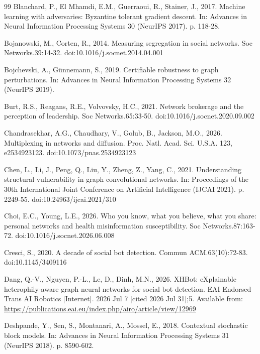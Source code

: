 \documentclass[onecolumn,pdflatex,sn-basic,Numbered]{sn-jnl}
\theoremstyle{thmstyleone}
\theoremstyle{thmstylethree}
\begin{document}
\begin{thebibliography}{99}
Blanchard, P., El Mhamdi, E.M., Guerraoui, R., Stainer, J., 2017. Machine learning with adversaries: Byzantine tolerant gradient descent. In: Advances in Neural Information Processing Systems 30 (NeurIPS 2017). p. 118-28.

Bojanowski, M., Corten, R., 2014. Measuring segregation in social networks. Soc Networks.39:14-32. doi:10.1016/j.socnet.2014.04.001

Bojchevski, A., G\"unnemann, S., 2019. Certifiable robustness to graph perturbations. In: Advances in Neural Information Processing Systems 32 (NeurIPS 2019).

Burt, R.S., Reagans, R.E., Volvovsky, H.C., 2021. Network brokerage and the perception of leadership. Soc Networks.65:33-50. doi:10.1016/j.socnet.2020.09.002

Chandrasekhar, A.G., Chaudhary, V., Golub, B., Jackson, M.O., 2026. Multiplexing in networks and diffusion. Proc. Natl. Acad. Sci. U.S.A. 123, e2534923123. doi:10.1073/pnas.2534923123

Chen, L., Li, J., Peng, Q., Liu, Y., Zheng, Z., Yang, C., 2021. Understanding structural vulnerability in graph convolutional networks. In: Proceedings of the 30th International Joint Conference on Artificial Intelligence (IJCAI 2021). p. 2249-55. doi:10.24963/ijcai.2021/310

Choi, E.C., Young, L.E., 2026. Who you know, what you believe, what you share: personal networks and health misinformation susceptibility. Soc Networks.87:163-72. doi:10.1016/j.socnet.2026.06.008

Cresci, S., 2020. A decade of social bot detection. Commun ACM.63(10):72-83. doi:10.1145/3409116

Dang, Q.-V., Nguyen, P.-L., Le, D., Dinh, M.N., 2026. XHBot: eXplainable heterophily-aware graph neural networks for social bot detection. EAI Endorsed Trans AI Robotics [Internet]. 2026 Jul 7 [cited 2026 Jul 31];5. Available from: \url{https://publications.eai.eu/index.php/airo/article/view/12969}

Deshpande, Y., Sen, S., Montanari, A., Mossel, E., 2018. Contextual stochastic block models. In: Advances in Neural Information Processing Systems 31 (NeurIPS 2018). p. 8590-602.


\end{thebibliography}
\end{document}
